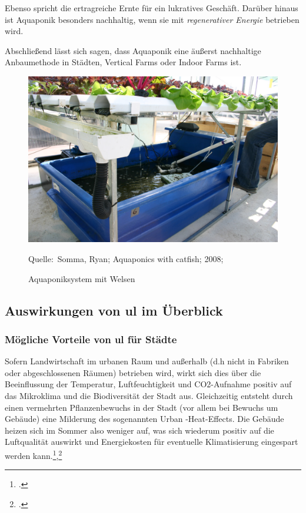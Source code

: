 \documentclass{scrartcl}
\newcommand*{\Bildquelle}[1]{\par\raggedleft\footnotesize Quelle:~#1}
\begin{document}
Ebenso spricht die ertragreiche Ernte für ein lukratives Geschäft. Darüber hinaus ist Aquaponik besonders nachhaltig, wenn sie mit \textit{regenerativer Energie} betrieben wird. 

Abschließend lässt sich sagen, dass Aquaponik eine äußerst nachhaltige Anbaumethode in Städten, Vertical Farms oder Indoor Farms ist. 



\begin{figure}[htbp]
\centering
\caption{Aquaponiksystem mit Welsen}
\includegraphics[width=12cm]{image_folder/Aquaponics_with_catfish.jpg}
\Bildquelle{Somma, Ryan; Aquaponics with catfish; 2008;}
\label{fig:aquaponik}
\end{figure}

\subsection{Auswirkungen von \acs{ul} im Überblick}
     \subsubsection{Mögliche Vorteile von \acs{ul} für Städte}  


Sofern Landwirtschaft im urbanen Raum und außerhalb (d.h nicht in Fabriken oder abgeschlossenen Räumen) betrieben wird, wirkt sich dies über die Beeinflussung der Temperatur, Luftfeuchtigkeit und CO2-Aufnahme positiv auf das Mikroklima und die Biodiversität der Stadt aus.
Gleichzeitig entsteht durch einen vermehrten Pflanzenbewuchs in der Stadt (vor allem bei Bewuchs um Gebäude) eine Milderung des sogenannten Urban -Heat-Effects. Die Gebäude heizen sich im Sommer also weniger auf, was sich wiederum positiv auf die Luftqualität auswirkt und Energiekosten für eventuelle Klimatisierung eingespart werden kann.\footcite{Schulz2013UrbaneLandmanagements},\footcite[Vgl.][S.16]{Spring2012DerBasel-Stadt}
\end{document}
